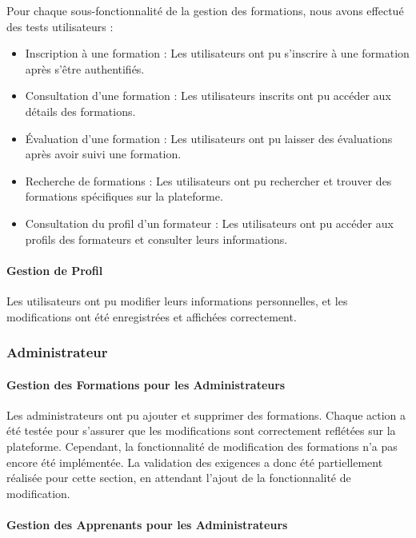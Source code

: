 Pour chaque sous-fonctionnalité de la gestion des formations, nous avons effectué des tests utilisateurs :
\begin{itemize}
\item Inscription à une formation : Les utilisateurs ont pu s'inscrire à une formation après s'être authentifiés.
\item Consultation d'une formation : Les utilisateurs inscrits ont pu accéder aux détails des formations.
\item Évaluation d'une formation : Les utilisateurs ont pu laisser des évaluations après avoir suivi une formation.
\item Recherche de formations : Les utilisateurs ont pu rechercher et trouver des formations spécifiques sur la plateforme.
\item Consultation du profil d'un formateur : Les utilisateurs ont pu accéder aux profils des formateurs et consulter leurs informations.
\end{itemize}

\paragraph{Gestion de Profil}

Les utilisateurs ont pu modifier leurs informations personnelles, et les modifications ont été enregistrées et affichées correctement.

\subsubsection{Administrateur}

\paragraph{Gestion des Formations pour les Administrateurs}

Les administrateurs ont pu ajouter et supprimer des formations. Chaque action a été testée pour s'assurer que les modifications sont correctement reflétées sur la plateforme. Cependant, la fonctionnalité de modification des formations n'a pas encore été implémentée. La validation des exigences a donc été partiellement réalisée pour cette section, en attendant l'ajout de la fonctionnalité de modification.

\paragraph{Gestion des Apprenants pour les Administrateurs}

